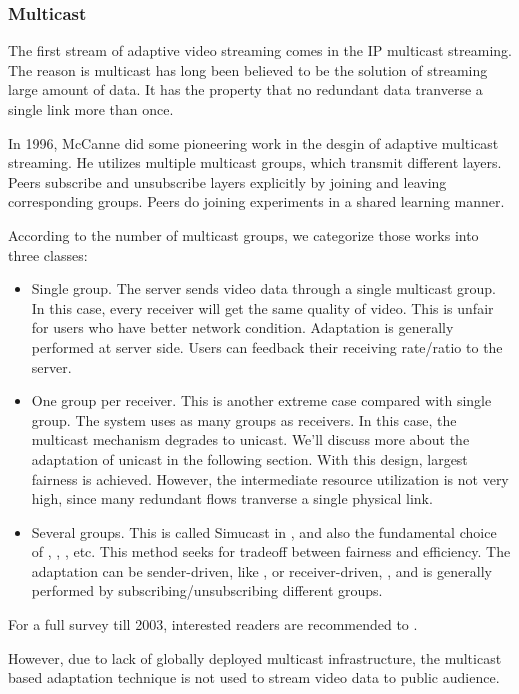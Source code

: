 \documentclass[11pt,a4paper]{article}
\begin{document}
\subsubsection{Multicast}
The first stream of adaptive video streaming comes in the IP multicast 
streaming. The reason is multicast has long been believed to be the 
solution of streaming large amount of data. It has the property 
that no redundant data tranverse a single link more than once. 

In 1996, McCanne \cite{mccanne1996receiver} did some pioneering 
work in the desgin of adaptive multicast streaming. He utilizes 
multiple multicast groups, which transmit different layers. Peers
subscribe and unsubscribe layers explicitly by joining and leaving 
corresponding groups. Peers do joining experiments in a shared learning
manner. 

According to the number of multicast groups, we categorize those works
into three classes:
\begin{itemize}
	\item Single group. The server sends video data through a single multicast
	group. In this case, every receiver will get the same quality of 
	video. This is unfair for users who have better network condition. 
	Adaptation is generally performed at server side. Users can feedback 
	their receiving rate/ratio to the server. 
	\item One group per receiver. This is another extreme case compared 
	with single group. The system uses as many groups as receivers. In this 
	case, the multicast mechanism degrades to unicast. We'll discuss more about
	the adaptation of unicast in the following section. With this design, 
	largest fairness is achieved. However, the intermediate resource utilization 
	is not very high, since many redundant flows tranverse a single physical link. 
	\item Several groups. This is called Simucast in \cite{liu2003adaptive}, and 
	also the fundamental choice of \cite{mccanne1996receiver}, 
	\cite{bhattacharyya1998efficient}, \cite{byers2001fine}, etc. This method 
	seeks for tradeoff between fairness and efficiency. The adaptation 
	can be sender-driven, like \cite{bhattacharyya1998efficient}, 
	or receiver-driven, \cite{mccanne1996receiver}, and is generally 
	performed by subscribing/unsubscribing different groups.  
\end{itemize}
For a full survey till 2003, interested readers are recommended to \cite{liu2003adaptive}. 

However, due to lack of globally deployed multicast infrastructure, 
the multicast based adaptation technique is not used to stream video
data to public audience. 
\end{document}
